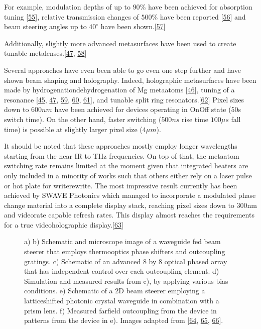 \documentclass[a4paper,10pt,english,openany,oneside]{jupyterBook}
\begin{document}
\sphinxAtStartPar
For example, modulation depths of up to \(90\%\) have been achieved for absorption tuning {[}\hyperlink{cite.bib:id148}{55}{]}, relative transmission changes of \(500\%\) have been reported {[}\hyperlink{cite.bib:id76}{56}{]} and beam steering angles up to \(40^{\circ}\) have been shown.{[}\hyperlink{cite.bib:id69}{57}{]}

\sphinxAtStartPar
Additionally, slightly more advanced metasurfaces have been used to create tunable metalenses.{[}\hyperlink{cite.bib:id332}{47}, \hyperlink{cite.bib:id82}{58}{]}

\sphinxAtStartPar
Several approaches have even been able to go even one step further and have shown beam shaping and holography. Indeed, holographic metasurfaces have been made by hydrogenation\sphinxhyphen{}dehydrogenation of Mg meta\sphinxhyphen{}atoms {[}\hyperlink{cite.bib:id17}{46}{]}, tuning of a resonance {[}\hyperlink{cite.bib:id227}{45}, \hyperlink{cite.bib:id332}{47}, \hyperlink{cite.bib:id28}{59}, \hyperlink{cite.bib:id387}{60}, \hyperlink{cite.bib:id44}{61}{]}, and tunable split ring resonators.{[}\hyperlink{cite.bib:id437}{62}{]} Pixel sizes down to \(600nm\) have been achieved for devices operating in On\sphinxhyphen{}Off state (\(50\)s switch time). On the other hand, faster switching (\(500ns\) rise time \sphinxhyphen{} \(100\mu s\) fall time) is possible at slightly larger pixel size (\(4\mu m\)).

\sphinxAtStartPar
It should be noted that these approaches mostly employ longer wavelengths starting from the near IR to THz frequencies. On top of that, the meta\sphinxhyphen{}atom switching rate remains limited at the moment given that integrated heaters are only included in a minority of works such that others either rely on a laser pulse or hot plate for write\sphinxhyphen{}rewrite. The most impressive result currently has been achieved by SWAVE Photonics which managed to incorporate a modulated phase change material into a complete display stack, reaching pixel sizes down to \(300\)nm and video\sphinxhyphen{}rate capable refresh rates. This display almost reaches the requirements for a true videoholographic display.{[}\hyperlink{cite.bib:id412}{63}{]}

\begin{figure}[htbp]
\centering
\capstart

\noindent{}
\caption{a)\sphinxhyphen{} b) Schematic and microscope image of a waveguide fed beam steerer that employs thermo\sphinxhyphen{}optics phase shifters and outcoupling gratings. c) Schematic of an advanced \(8\) by \(8\) optical phased array that has independent control over each outcoupling element. d) Simulation and measured results from c), by applying various bias conditions. e) Schematic of a 2D beam steerer employing a lattice\sphinxhyphen{}shifted photonic crystal waveguide in combination with a prism lens. f) Measured farfield outcoupling from the device in patterns from the device in e). Images adapted from {[}\hyperlink{cite.bib:id330}{64}, \hyperlink{cite.bib:id258}{65}, \hyperlink{cite.bib:id496}{66}{]}.}\label{\detokenize{sota:chapter2-image13}}\end{figure}
\end{document}
